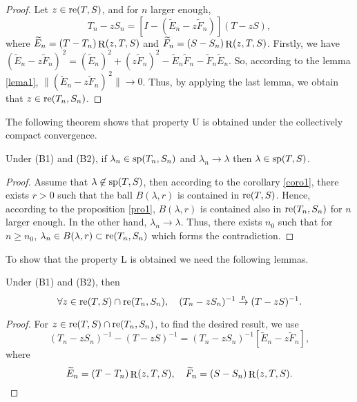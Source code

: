 \documentclass[
11pt,%
tightenlines,%
twoside,%
onecolumn,%
nofloats,%
nobibnotes,%
nofootinbib,%
superscriptaddress,%
noshowpacs,%
centertags]%
{revtex4}
\def\re{\mathop{\rm re}\nolimits}
\def\R{\mathop{\rm R}\nolimits}
\def\sp{\mathop{\rm sp}\nolimits}
\def\re{\mathop{\rm re}\nolimits}
\begin{document}
\begin{proof}Let $z\in\re(T,S)$, and for $n$ larger enough,
\begin{equation*}
    T_n-zS_n=[I-(\widetilde{E}_n-z\widetilde{F}_n)](T-zS),
\end{equation*}
where $\widetilde{E}_n=(T-T_n)\R(z,T,S)$ and $\widetilde{F}_n=(S-S_n)\R(z,T,S)$. Firstly, we have $(\widetilde{E}_n-z\widetilde{F}_n)^{\,2}=(\widetilde{E}_n)^2+(z\widetilde{F}_{n})^{2} -\widetilde{E}_n\widetilde{F}_n-\widetilde{F}_n\widetilde{E}_n$. So, according to the lemma \ref{lema1}, $\|(\widetilde{E}_n-z\widetilde{F}_n)^{\,2}\|\rightarrow0$. Thus, by applying the last lemma, we obtain that $z\in \re(T_n,S_n)$.
\end{proof}\par
The following theorem shows that property U is obtained under the collectively compact convergence.
\begin{theorem}
Under (B1) and (B2), if $\lambda_n\in\sp(T_n,S_n)$ and $\lambda_n\rightarrow\lambda$ then $\lambda\in\sp(T,S)$.
\end{theorem}
\begin{proof} Assume that $\lambda\not\in\sp(T,S)$, then according to the corollary \ref{coro1}, there exists $r>0$ such that the ball $B(\lambda,r)$ is contained in $\re(T,S)$. Hence, according to the proposition \ref{pro1},  $B(\lambda,r)$ is contained also in $\re(T_n,S_n)$ for $n$ larger enough. In the other hand, $\lambda_n\rightarrow\lambda$. Thus, there exists $n_0$ such that for $n\geq n_0$, $\lambda_n\in B(\lambda,r)\subset\re(T_n,S_n)$ which forms the contradiction.
\end{proof}
To show that the property L is obtained we need the following lemmas.
\begin{lemma}\label{lema3}
Under (B1) and (B2), then
\begin{equation*}
    \forall z\in\re(T,S)\cap\re(T_n,S_n),\quad (T_n-zS_n)^{-1}\stackrel{p}{\rightarrow}(T-zS)^{-1}.
\end{equation*}
\end{lemma}
\begin{proof}For $z\in\re(T,S)\cap\re(T_n,S_n)$, to find the desired result, we use
\begin{equation*}
(T_n-zS_n)^{-1}-(T-zS)^{-1}=(T_n-zS_n)^{-1}[\widetilde{E}_n-z\widetilde{F}_n],
\end{equation*}
where
\begin{equation*}
 \widetilde{E}_n=(T-T_n)\R(z,T,S),\quad \widetilde{F}_n=(S-S_n)\R(z,T,S).
\end{equation*}
\end{proof}
\end{document}
